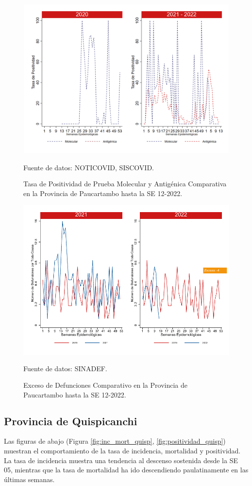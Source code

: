 \documentclass[12pt,a4paper,openany]{book}
\begin{document}
		\begin{figure}[h]
			\caption{Tasa de Positividad de Prueba Molecular y Antigénica Comparativa en la Provincia de Paucartambo hasta la SE 12-2022.}\label{fig:positividad_paucartam}
			\begin{center}
				\includegraphics[width=0.7\linewidth]{../figuras/positividad_20_21_11.png}
			\end{center}
			{\footnotesize {Fuente de datos: NOTICOVID, SISCOVID.}}
		\end{figure}
		
		\begin{figure}[h]
			\caption{Exceso de Defunciones Comparativo en la Provincia de Paucartambo hasta la SE 12-2022.}\label{fig:exceso_paucartam}
			\begin{center}
				\includegraphics[width=0.7\linewidth]{../figuras/exceso_11.pdf}
			\end{center}
			{\footnotesize {Fuente de datos: SINADEF.}}
		\end{figure}
		
		\clearpage
		
		\subsection*{Provincia de Quispicanchi}
		\noindent Las figuras de abajo (Figura \ref{fig:inc_mort_quisp}, \ref{fig:positividad_quisp}) muestran el comportamiento de la tasa de incidencia, mortalidad y positividad. La tasa de incidencia muestra una tendencia al descenso sostenida desde la SE 05, mientras que la tasa de mortalidad ha ido descendiendo paulatinamente en las últimas semanas.      
		
\end{document}
